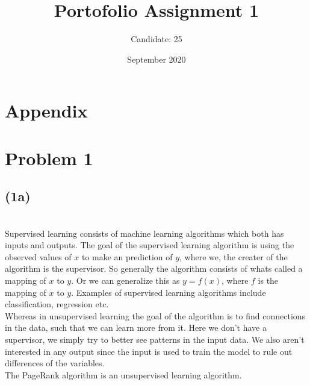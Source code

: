 \documentclass[12pt, letterpaper]{article}
\title{Portofolio Assignment 1}
\author{Candidate: 25}
\date{September 2020}
\begin{document}
  \maketitle
  \section*{Appendix}
  \newpage
  \section*{Problem 1}
    \subsection*{(1a)} \\
    Supervised learning consists of machine learning algorithms which both has inputs and outputs. The goal of the supervised learning algorithm is using the observed values of $x$ to make an prediction of $y$, where we, the creater of the algorithm is the supervisor. So generally the algorithm consists of whats called a mapping of $x$ to $y$. Or we can generalize this as $y = f(x)$, where $f$ is the mapping of $x$ to $y$. Examples of supervised learning algorithms include classification, regression etc.\\
    \newline
    Whereas in unsupervised learning the goal of the algorithm is to find connections in the data, such that we can learn more from it. Here we don't have a supervisor, we simply try to better see patterns in the input data. We also aren't interested in any output since the input is used to train the model to rule out differences of the variables.\\
    \newline
    The PageRank algorithm is an unsupervised learning algorithm.\\
\end{document}
